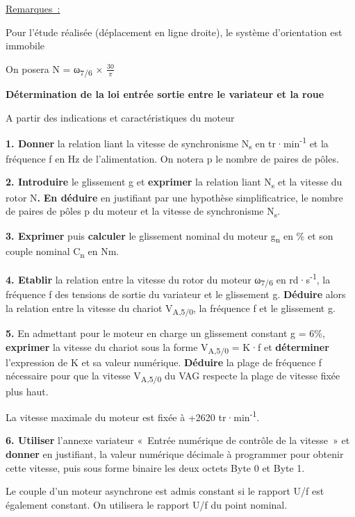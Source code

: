 \ul{Remarques~:}

Pour l'étude réalisée (déplacement en ligne droite), le système d'orientation est immobile

On posera N = ω\textsubscript{7/6} × \(\frac{30}{\pi}\)

\textbf{Détermination de la loi entrée sortie entre le variateur et la roue}

A partir des indications et caractéristiques du moteur

\textbf{1. Donner} la relation liant la vitesse de synchronisme N\textsubscript{s} en tr·min\textsuperscript{-1} et la fréquence f en Hz de l'alimentation. On notera p le nombre de paires de pôles.

\textbf{2. Introduire} le glissement g et \textbf{exprimer} la relation liant N\textsubscript{s} et la vitesse du rotor N\textbf{.} \textbf{En déduire} en justifiant par une hypothèse simplificatrice, le nombre de paires de pôles p du moteur et la vitesse de synchronisme N\textsubscript{s}.

\textbf{3. Exprimer} puis \textbf{calculer} le glissement nominal du moteur g\textsubscript{n} en \% et son couple nominal C\textsubscript{n} en Nm.

\textbf{4. Etablir} la relation entre la vitesse du rotor du moteur ω\textsubscript{7/6} en rd·s\textsuperscript{-1}, la fréquence f des tensions de sortie du variateur et le glissement g. \textbf{Déduire} alors la relation entre la vitesse du chariot V\textsubscript{A,5/0}, la fréquence f et le glissement g.

\textbf{5.} En admettant pour le moteur en charge un glissement constant g = 6\%, \textbf{exprimer} la vitesse du chariot sous la forme V\textsubscript{A,5/0} = K·f et \textbf{déterminer} l'expression de K et sa valeur numérique. \textbf{Déduire} la plage de fréquence f nécessaire pour que la vitesse V\textsubscript{A,5/0} du VAG respecte la plage de vitesse fixée plus haut.

La vitesse maximale du moteur est fixée à +2620 tr·min\textsuperscript{-1}.

\textbf{6. Utiliser} l'annexe variateur «~Entrée numérique de contrôle de la vitesse~» et \textbf{donner} en justifiant, la valeur numérique décimale à programmer pour obtenir cette vitesse, puis sous forme binaire les deux octets Byte 0 et Byte 1.

Le couple d'un moteur asynchrone est admis constant si le rapport U/f est également constant. On utilisera le rapport U/f du point nominal.


